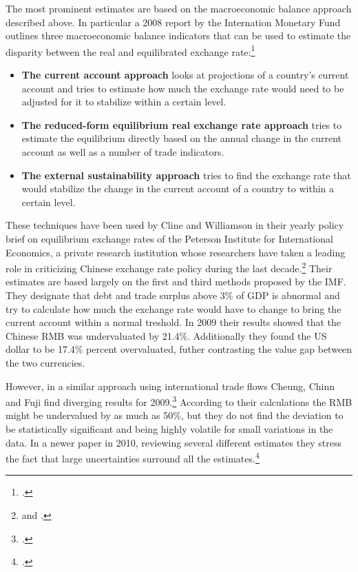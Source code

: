 The most prominent estimates are based on the macroeconomic balance 
approach described above. In particular a 2008 report by the Internation 
Monetary Fund outlines three macroeconomic balance indicators that can 
be used to estimate the disparity between the real and equilibrated 
exchange rate:\footnote{\cite[pp. 1]{Lee2008}.}

\begin{itemize}
	\item{\textbf{The current account approach} looks at projections of 
		a country's current account and tries to estimate how much the 
	exchange rate would need to be adjusted for it to stabilize within a 
certain level.}
\item{\textbf{The reduced-form equilibrium real exchange rate approach}
	tries to estimate the equilibrium directly based on the annual 
change in the current account as well as a number of trade indicators.}
\item{\textbf{The external sustainability approach} tries to find the 
	exchange rate that would stabilize the change in the current account 
of a country to within a certain level.}
\end{itemize}

These techniques have been used by Cline and Williamson in 
their yearly policy brief on equilibrium exchange rates of the Peterson 
Institute for International Economics, a private research institution 
whose researchers have taken a leading role in criticizing Chinese 
exchange rate policy during the last decade.\footnote{\cite{Cline2009} 
and \cite{Cline2012}.} Their estimates are based largely on the first 
and third methods proposed by the IMF. They designate that debt and 
trade surplus above 3\% of GDP is abnormal and try to calculate how much 
the exchange rate would have to change to bring the current account 
within a normal treshold. In 2009 their results showed that the Chinese 
RMB was undervaluated by 21.4\%. Additionally they found the US dollar 
to be 17.4\% percent overvaluated, futher contrasting the value gap 
between the two currencies.

However, in a similar approach using international trade flows Cheung, 
Chinn and Fuji find diverging results for 
2009.\footnote{\cite{Cheung2009}.} According to their calculations the 
RMB might be undervalued by as much as 50\%, but they do not find the 
deviation to be statistically significant and being highly volatile for 
small variations in the data. In a newer paper in 2010, reviewing 
several different estimates they stress the fact that large 
uncertainties surround all the estimates.\footnote{\cite{Cheung2010}.}


